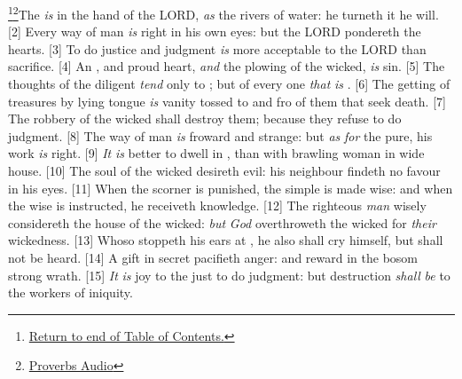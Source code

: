 \footnote{\textcolor[cmyk]{0.99998,1,0,0}{\hyperlink{TOC}{Return to end of Table of Contents.}}}\footnote{\href{https://audiobible.com/bible/bible.html}{\textcolor[cmyk]{0.99998,1,0,0}{Proverbs Audio}}}\textcolor[cmyk]{0.99998,1,0,0}{The  \emph{is} in the hand of the LORD, \emph{as} the rivers of water: he turneth it  he will.}
[2] \textcolor[cmyk]{0.99998,1,0,0}{Every way of   man \emph{is} right in his own eyes: but the LORD pondereth the hearts.}
[3] \textcolor[cmyk]{0.99998,1,0,0}{To do justice and judgment \emph{is} more acceptable to the LORD than sacrifice.}
[4] \textcolor[cmyk]{0.99998,1,0,0}{An , and   proud heart, \emph{and} the plowing of the wicked, \emph{is} sin.}
[5] \textcolor[cmyk]{0.99998,1,0,0}{The thoughts of the diligent \emph{tend} only to ; but of every one \emph{that} \emph{is} .}
[6] \textcolor[cmyk]{0.99998,1,0,0}{The getting of treasures by   lying tongue \emph{is}   vanity tossed to and fro of them that seek death.}
[7] \textcolor[cmyk]{0.99998,1,0,0}{The robbery of the wicked shall destroy them; because they refuse to do judgment.}
[8] \textcolor[cmyk]{0.99998,1,0,0}{The way of man \emph{is} froward and strange: but \emph{as} \emph{for} the pure, his work \emph{is} right.}
[9] \textcolor[cmyk]{0.99998,1,0,0}{\emph{It} \emph{is} better to dwell in   , than with   brawling woman in  wide house.}
[10] \textcolor[cmyk]{0.99998,1,0,0}{The soul of the wicked desireth evil: his neighbour findeth no favour in his eyes.}
[11] \textcolor[cmyk]{0.99998,1,0,0}{When the scorner is punished, the simple is made wise: and when the wise is instructed, he receiveth knowledge.}
[12] \textcolor[cmyk]{0.99998,1,0,0}{The righteous \emph{man} wisely considereth the house of the wicked: \emph{but} \emph{God} overthroweth the wicked for \emph{their} wickedness.}
[13] \textcolor[cmyk]{0.99998,1,0,0}{Whoso stoppeth his ears at , he also shall cry himself, but shall not be heard.}
[14] \textcolor[cmyk]{0.99998,1,0,0}{A gift in secret pacifieth anger: and  reward in the bosom strong wrath.}
[15] \textcolor[cmyk]{0.99998,1,0,0}{\emph{It} \emph{is} joy to the just to do judgment: but destruction \emph{shall} \emph{be} to the workers of iniquity.}

